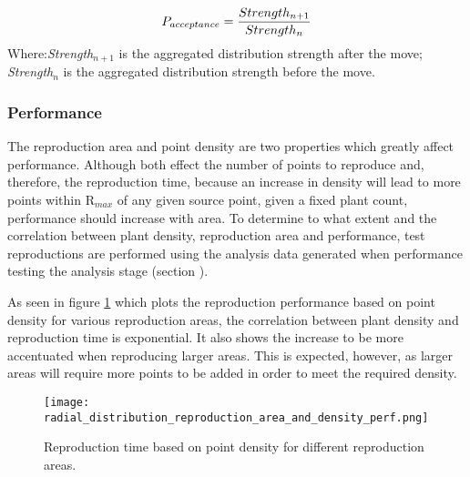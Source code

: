 \begin{equation}
\centering
P_{acceptance} = \frac{Strength_{n+1}}{Strength_{n}}
\label{eq:reproduction_probability_acceptance}
\end{equation}
Where:\textit{Strength$_{n+1}$} is the aggregated distribution strength after the move; \textit{Strength$_{n}$} is the aggregated distribution strength before the move.

\subsubsection{Performance}

The reproduction area and point density are two properties which greatly affect performance. Although both effect the number of points to reproduce and, therefore, the reproduction time, because an increase in density will lead to more points within R$_{max}$ of any given source point, given a fixed plant count, performance should increase with area. To determine to what extent and the correlation between plant density, reproduction area and performance, test reproductions are performed using the analysis data generated when performance testing the analysis stage (section \label{subsubsec:analysis_performance}).

As seen in figure \ref{fig:reproduction_density_area_perf} which plots the reproduction performance based on point density for various reproduction areas, the correlation between plant density and reproduction time is exponential. It also shows the increase to be more accentuated when reproducing larger areas. This is expected, however, as larger areas will require more points to be added in order to meet the required density.\\

\begin{figure}
\center
	\texttt{[image: radial\_distribution\_reproduction\_area\_and\_density\_perf.png]}
	\caption{ Reproduction time based on point density for different reproduction areas.}	
	\label{fig:reproduction_density_area_perf}
\end{figure}

